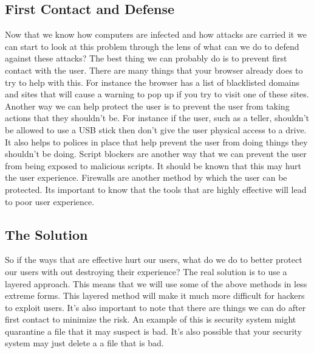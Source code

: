 \documentclass[letterpaper, onecolumn,10pt]{IEEEtran}
\begin{document}
            \subsection{First Contact and Defense}
            Now that we know how computers are infected and how attacks are carried it we can start to look at this problem through the lens of what can we do to defend against these attacks? The best thing we can probably do is to prevent first contact with the user. There are many things that your browser already does to try to help with this. For instance the browser has a list of blacklisted domains and sites that will cause a warning to pop up if you try to visit one of these sites. Another way we can help protect the user is to prevent the user from taking actions that they shouldn't be. For instance if the user, such as a teller, shouldn't be allowed to use a USB stick then don't give the user physical access to a drive. It also helps to polices in place that help prevent the user from doing things they shouldn't be doing. Script blockers are another way that we can prevent the user from being exposed to malicious scripts. It should be known that this may hurt the user experience. Firewalls are another method by which the user can be protected. Its important to know that the tools that are highly effective will lead to poor user experience.\\
            
            \subsection{The Solution}
            So if the ways that are effective hurt our users, what do we do to better protect our users with out destroying their experience? The real solution is to use a layered approach. This means that we will use some of the above methods in less extreme forms. This layered method will make it much more difficult for hackers to exploit users. It's also important to note that there are things we can do after first contact to minimize the risk. An example of this is security system might quarantine a file that it may suspect is bad. It's also possible that your security system may just delete a a file that is bad.\\
            
\end{document}

